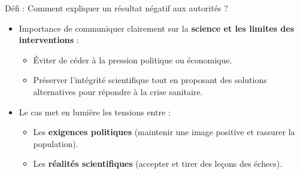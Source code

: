 \documentclass[
  ignorenonframetext,
]{beamer}
\providecommand{\tightlist}{%
  \setlength{\itemsep}{0pt}\setlength{\parskip}{0pt}}\usepackage{longtable,booktabs,array}
\begin{document}
\begin{frame}
\begin{block}{Défi : Comment expliquer un résultat négatif aux autorités
?}
\protect\hypertarget{duxe9fi-comment-expliquer-un-ruxe9sultat-nuxe9gatif-aux-autorituxe9s}{}
\begin{itemize}
\tightlist
\item
  Importance de communiquer clairement sur la \textbf{science et les
  limites des interventions} :

  \begin{itemize}
  \tightlist
  \item
    Éviter de céder à la pression politique ou économique.
  \item
    Préserver l'intégrité scientifique tout en proposant des solutions
    alternatives pour répondre à la crise sanitaire.
  \end{itemize}
\item
  Le cas met en lumière les tensions entre :

  \begin{itemize}
  \tightlist
  \item
    Les \textbf{exigences politiques} (maintenir une image positive et
    rassurer la population).
  \item
    Les \textbf{réalités scientifiques} (accepter et tirer des leçons
    des échecs).
  \end{itemize}
\end{itemize}
\end{block}
\end{frame}
\end{document}
